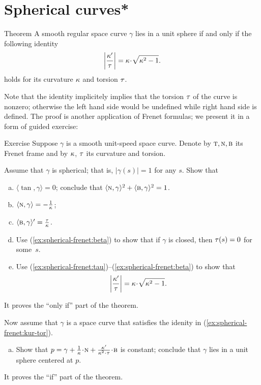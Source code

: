 \section*{Spherical curves*}

\begin{thm}{Theorem}
A smooth regular space curve $\gamma$ lies in a unit sphere if and only if 
the following identity 
\[\left|\frac{\kur'}{\tor}\right|=\kur\cdot\sqrt{\kur^2-1}.\]
holds for its curvature $\kappa$ and torsion $\tau$.
\end{thm}

Note that the identity implicitely implies that the torsion $\tau$ of the curve is nonzero;
otherwise the left hand side would be undefined while right hand side is defined.
The proof is another application of Frenet formulas;
we present it in a form of guided exercise:

\begin{thm}{Exercise}\label{ex:spherical-frenet}
Suppose $\gamma$ is a smooth unit-speed space curve.
Denote by $\textsc{t},\textsc{n},\textsc{b}$ its Frenet frame and by $\kappa$, $\tau$ its curvature and torsion.

\smallskip

Assume that $\gamma$ is spherical; that is, $|\gamma(s)|=1$ for any $s$.
Show that

\begin{enumerate}[(a)]
\item\label{ex:spherical-frenet:tau} $\langle\tan,\gamma\rangle=0$; conclude that $\langle\textsc{n},\gamma\rangle^2+\langle\textsc{b},\gamma\rangle^2=1$.
\item\label{ex:spherical-frenet:nu} $\langle\textsc{n},\gamma\rangle=-\tfrac1{\kappa}$;
\item\label{ex:spherical-frenet:beta} $\langle\textsc{b},\gamma\rangle'=\tfrac{\tau}{\kappa}$.
\item\label{ex:spherical-frenet:beta+}
Use (\ref{ex:spherical-frenet:beta}) to show that if $\gamma$ is closed, then $\tau(s)=0$ for some~$s$.
\item\label{ex:spherical-frenet:kur-tor} Use (\ref{ex:spherical-frenet:tau})--(\ref{ex:spherical-frenet:beta}) to show that 
\[\left|\frac{\kur'}{\tor}\right|=\kur\cdot\sqrt{\kur^2-1}.\]
\setcounter{lastnumber}{\value{enumi}}
\end{enumerate}
It proves the ``only if'' part of the theorem.

\smallskip

Now assume that $\gamma$ is a space curve that satisfies the idenity in (\ref{ex:spherical-frenet:kur-tor}).
\begin{enumerate}[(a)]
\setcounter{enumi}{\value{lastnumber}}
\item Show that $p=\gamma+\tfrac1\kur\cdot \norm+\tfrac{\kur'}{\kur^2\cdot\tor}\cdot\bi$ is constant; conclude that $\gamma$ lies in a unit sphere centered at $p$.
\end{enumerate}
It proves the ``if'' part of the theorem.
\end{thm}


